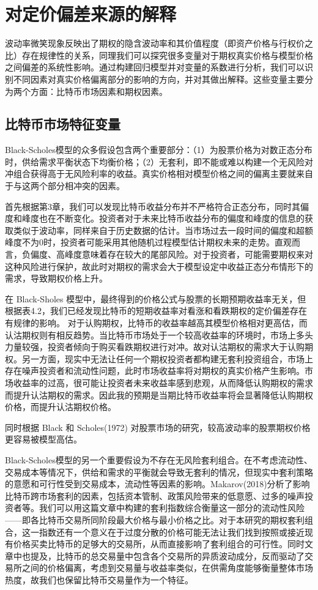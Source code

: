 \section{对定价偏差来源的解释}\label{reg vars}
波动率微笑现象反映出了期权的隐含波动率和其价值程度（即资产价格与行权价之比）存在规律性的关系，同理我们可以探究很多变量对于期权真实价格与模型价格之间偏差的系统性影响。通过构建回归模型并对变量的系数进行分析，我们可以识别不同因素对真实价格偏离部分的影响的方向，并对其做出解释。这些变量主要分为两个方面：比特币市场因素和期权因素。
\subsection{比特币市场特征变量}
\par{Black-Scholes模型的众多假设包含两个重要部分：（1）为股票价格为对数正态分布时，供给需求平衡状态下均衡价格；（2）无套利，即不能或难以构建一个无风险对冲组合获得高于无风险利率的收益。真实价格相对模型价格之间的偏离主要就来自于与这两个部分相冲突的因素。}
\par{首先根据第3章，我们可以发现比特币收益分布并不严格符合正态分布，同时其偏度和峰度也在不断变化。投资者对于未来比特币收益分布的偏度和峰度的信息的获取类似于波动率，同样来自于历史数据的估计。当市场过去一段时间的偏度和超额峰度不为0时，投资者可能采用其他随机过程模型估计期权未来的走势。直观而言，负偏度、高峰度意味着存在较大的尾部风险。对于投资者，可能需要期权来对这种风险进行保护，故此时对期权的需求会大于模型设定中收益正态分布情形下的需求，导致期权价格上升。}
\par{在 Black-Sholes 模型中，最终得到的价格公式与股票的长期预期收益率无关，但根据表4.2，我们已经发现比特币的短期收益率对看涨和看跌期权的定价偏差存在有规律的影响。  对于认购期权，比特币的收益率越高其模型价格相对更高估，而认沽期权则有相反趋势。当比特币市场处于一个较高收益率的环境时，市场上多头力量较强，投资者倾向于购买看跌期权进行对冲。故对认沽期权的需求大于认购期权。另一方面，现实中无法让任何一个期权投资者都构建无套利投资组合，市场上存在噪声投资者和流动性问题，此时市场收益率将对期权的真实价格产生影响。市场收益率的过高，很可能让投资者未来收益率感到悲观，从而降低认购期权的需求而提升认沽期权的需求。因此我的预期是当期比特币收益率将会显著降低认购期权价格，而提升认沽期权价格。}
\par{同时根据 Black 和 Scholes(1972) 对股票市场的研究，较高波动率的股票期权价格更容易被模型高估。  }
\par{
    Black-Scholes模型的另一个重要假设为不存在无风险套利组合。在不考虑流动性、交易成本等情况下，供给和需求的平衡就会导致无套利的情况，但现实中套利策略的意愿和可行性受到交易成本，流动性等因素的影响。Makarov(2018)分析了影响比特币跨市场套利的因素，包括资本管制、政策风险带来的低意愿、过多的噪声投资者等\cite{Makarov-2018}。我们可以用这篇文章中构建的套利指数综合衡量这一部分的流动性风险——即各比特币交易所同阶段最大价格与最小价格之比。对于本研究的期权套利组合，这一指数还有一个意义在于过度分散的价格可能无法让我们找到按照或接近现有价格买卖比特币的足够大的交易所，从而直接影响了套利组合的可行性。同时文章中也提及，比特币的总交易量中包含各个交易所的异质波动成分，反而驱动了交易所之间的价格偏离，考虑到交易量与收益率类似，在供需角度能够衡量整体市场热度，故我们也保留比特币交易量作为一个特征。

}
